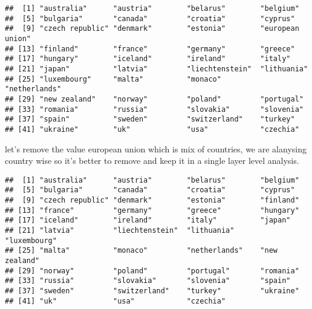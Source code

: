 \documentclass[
]{article}
\newenvironment{Shaded}{\begin{snugshade}}{\end{snugshade}}
\newcommand{\KeywordTok}[1]{\textcolor[rgb]{0.13,0.29,0.53}{\textbf{#1}}}
\newcommand{\NormalTok}[1]{#1}
\newcommand{\OperatorTok}[1]{\textcolor[rgb]{0.81,0.36,0.00}{\textbf{#1}}}
\newcommand{\StringTok}[1]{\textcolor[rgb]{0.31,0.60,0.02}{#1}}
\begin{document}
\begin{verbatim}
##  [1] "australia"      "austria"        "belarus"        "belgium"       
##  [5] "bulgaria"       "canada"         "croatia"        "cyprus"        
##  [9] "czech republic" "denmark"        "estonia"        "european union"
## [13] "finland"        "france"         "germany"        "greece"        
## [17] "hungary"        "iceland"        "ireland"        "italy"         
## [21] "japan"          "latvia"         "liechtenstein"  "lithuania"     
## [25] "luxembourg"     "malta"          "monaco"         "netherlands"   
## [29] "new zealand"    "norway"         "poland"         "portugal"      
## [33] "romania"        "russia"         "slovakia"       "slovenia"      
## [37] "spain"          "sweden"         "switzerland"    "turkey"        
## [41] "ukraine"        "uk"             "usa"            "czechia"
\end{verbatim}

let's remove the value european union which is mix of countries, we are
alanysing country wise so it's better to remove and keep it in a single
layer level analysis.

\begin{Shaded}
\end{Shaded}

\begin{verbatim}
##  [1] "australia"      "austria"        "belarus"        "belgium"       
##  [5] "bulgaria"       "canada"         "croatia"        "cyprus"        
##  [9] "czech republic" "denmark"        "estonia"        "finland"       
## [13] "france"         "germany"        "greece"         "hungary"       
## [17] "iceland"        "ireland"        "italy"          "japan"         
## [21] "latvia"         "liechtenstein"  "lithuania"      "luxembourg"    
## [25] "malta"          "monaco"         "netherlands"    "new zealand"   
## [29] "norway"         "poland"         "portugal"       "romania"       
## [33] "russia"         "slovakia"       "slovenia"       "spain"         
## [37] "sweden"         "switzerland"    "turkey"         "ukraine"       
## [41] "uk"             "usa"            "czechia"
\end{verbatim}
\end{document}
